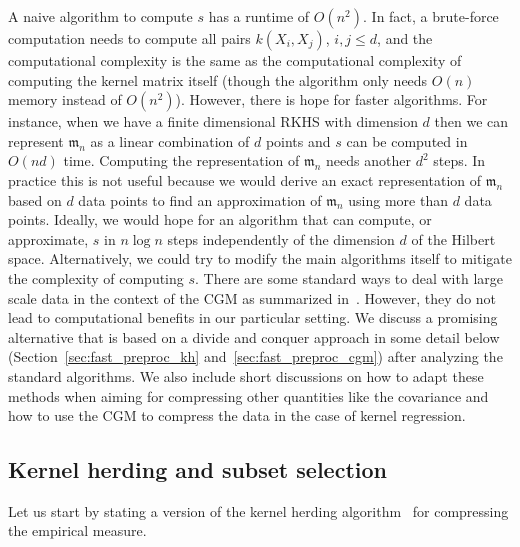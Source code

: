 \documentclass[10pt]{amsart}
\theoremstyle{definition}\newtheorem{defi}[theo]{Definition}\newtheorem{rema}[theo]{Remark}\newtheorem{exam}[theo]{Example}\newtheorem{exem}[theo]{Example}\newtheorem{nota}[theo]{Notation}
\theoremstyle{remark}
\newcommand{\mean}{\mathfrak{m}}
\newcounter{setofstep}
\newcounter{step}[setofstep]
\begin{document}
A naive algorithm to compute $s$ has a runtime of $O(n^2)$. In fact, a brute-force computation needs to compute all pairs $k(X_i,X_j)$, $i,j \leq d$, and the computational complexity is the same as the computational complexity of computing the kernel matrix itself (though the algorithm only needs $O(n)$ memory instead of $O(n^2)$). However, there is hope for faster algorithms. For instance, when we have a finite dimensional RKHS with dimension $d$ then we can represent $\mean_n$ as a linear combination of $d$ points and $s$ can be computed in $O(n d)$ time. Computing the representation of $\mean_n$ needs another $d^2$ steps. In practice this is not useful because we would derive an exact representation of $\mean_n$ based on $d$ data points to find an approximation of $\mean_n$ using more than $d$ data points. Ideally, we would hope for an algorithm that can compute, or approximate, $s$ in $n \log n$ steps independently of the dimension $d$ of the Hilbert space. Alternatively, we could try to modify the main algorithms itself to mitigate the complexity of computing $s$. There are some standard ways to deal with large scale data in the context of the CGM as summarized in~\cite{BRAU22}. However, they do not lead to computational benefits in our particular setting. We discuss a promising alternative that is based on a divide and conquer approach in some detail below (Section~\ref{sec:fast_preproc_kh} and~\ref{sec:fast_preproc_cgm}) after analyzing the standard algorithms. We also include short discussions on how to adapt these methods when aiming for compressing other quantities like the covariance and how to use the CGM to compress the data in the case of kernel regression.

\subsection{Kernel herding and subset selection} Let us start by stating a version of the kernel herding algorithm~\cite{CHEN10} for compressing the empirical measure.
\end{document}
